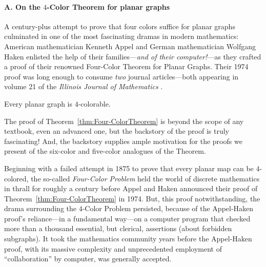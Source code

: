  

\paragraph{A. On the $4$-Color Theorem for planar graphs}

A century-plus attempt to prove that four colors suffice for planar graphs culminated in one of the most fascinating dramas in modern mathematics:  American mathematician Kenneth Appel and German mathematician Wolfgang Haken enlisted the help of their families---{\em and of their computer!}---as they crafted a proof of their renowned Four-Color Theorem for Planar Graphs.  Their 1974 proof was long enough to consume {\em two} journal articles---both appearing in volume 21 of the {\it Illinois Journal of Mathematics} \cite{AppelH77a,AppelH77b}.


\begin{theorem}
\label{thm:Four-ColorTheorem}
Every planar graph is $4$-colorable.
\end{theorem}


The proof of Theorem~\ref{thm:Four-ColorTheorem} is beyond the scope of any textbook, even an advanced one, but the backstory of the proof is truly fascinating!  And, the backstory supplies ample motivation for the proofs we present of the six-color and five-color analogues of the Theorem.

\medskip

Beginning with a failed attempt in 1875 to prove that every planar map can be $4$-colored, the so-called {\it Four-Color Problem} held the world of discrete mathematics in thrall for roughly a century before Appel and Haken announced their proof of 
Theorem~\ref{thm:Four-ColorTheorem} in 1974.  But, this proof notwithstanding, the drama surrounding the $4$-Color Problem persisted, because of the Appel-Haken proof's reliance---in a fundamental way---on a computer program that checked more than a thousand essential, but clerical, assertions (about forbidden subgraphs).  It took the mathematics community years before the Appel-Haken proof, with its massive complexity and unprecedented employment of ``collaboration'' by computer, was generally accepted.

